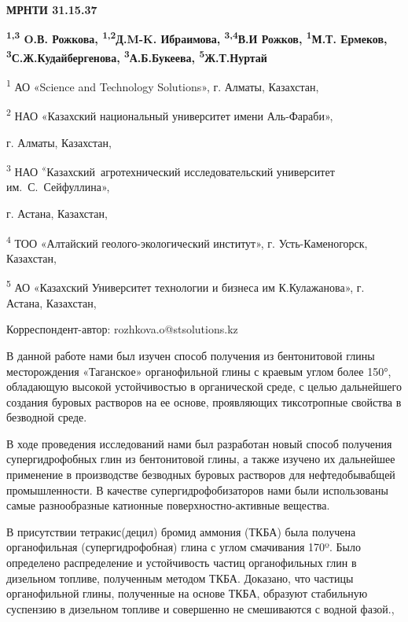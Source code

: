 \newpage
{\bfseries МРНТИ 31.15.37}


\begin{center}
{\bfseries \textsuperscript{1,3} O.В. Рожкова, \textsuperscript{1,2}Д.M-K. Ибраимова, \textsuperscript{3,4}В.И Рожков, \textsuperscript{1}М.Т. Ермеков, \textsuperscript{3}С.Ж.Кудайбергенова, \textsuperscript{3}А.Б.Букеева, \textsuperscript{5}Ж.Т.Нуртай}

\textsuperscript{1} АО «Science and Technology Solutions», г. Алматы,
Казахстан,

\textsuperscript{2} НАО «Казахский национальный университет имени
Аль-Фараби»,

г. Алматы, Казахстан,

\textsuperscript{3} НАО \textsuperscript{«}Казахский~агротехнический
исследовательский университет им.~С.~Сейфуллина»,

г. Астана, Казахстан,

\textsuperscript{4} ТОО «Алтайский геолого-экологический институт», г.
Усть-Каменогорск, Казахстан,

\textsuperscript{5} АО «Казахский Университет технологии и бизнеса им
К.Кулажанова», г. Астана, Казахстан,

Корреспондент-автор: rozhkova.o@stsolutions.kz
\end{center}

В данной работе нами был изучен способ получения из бентонитовой глины
месторождения «Таганское» органофильной глины с краевым углом более
150°, обладающую высокой устойчивостью в органической среде, с целью
дальнейшего создания буровых растворов на ее основе, проявляющих
тиксотропные свойства в безводной среде.

В ходе проведения исследований нами был разработан новый способ
получения супергидрофобных глин из бентонитовой глины, а также изучено
их дальнейшее применение в производстве безводных буровых растворов для
нефтедобывабщей промышленности. В качестве супергидрофобизаторов нами
были использованы самые разнообразные катионные поверхностно-активные
вещества.

В присутствии тетракис(децил) бромид аммония (ТКБА) была получена
органофильная (супергидрофобная) глина с углом смачивания 170º. Было
определено распределение и устойчивость частиц органофильных глин в
дизельном топливе, полученным методом ТКБА. Доказано, что частицы
органофильной глины, полученные на основе ТКБА, образуют стабильную
суспензию в дизельном топливе и совершенно не смешиваются с водной
фазой.,

